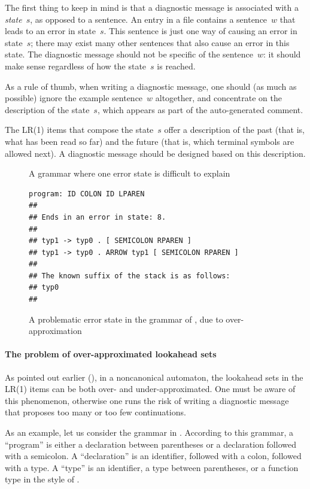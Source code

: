\documentclass[onecolumn,11pt,nocopyrightspace,preprint]{sigplanconf}
\begin{document}
The first thing to keep in mind is that a diagnostic message is associated
with a \emph{state}~$s$, as opposed to a sentence. An entry in a \messages
file contains a sentence~$w$ that leads to an error in state~$s$. This
sentence is just one way of causing an error in state~$s$; there may exist
many other sentences that also cause an error in this state. The diagnostic
message should not be specific of the sentence~$w$: it should make sense
regardless of how the state~$s$ is reached.

As a rule of thumb, when writing a diagnostic message, one should (as much as
possible) ignore the example sentence~$w$ altogether, and concentrate on the
description of the state~$s$, which appears as part of the auto-generated
comment.

The LR(1) items that compose the state~$s$ offer a description of the past
(that is, what has been read so far) and the future (that is, which terminal
symbols are allowed next). A diagnostic message should be designed based on
this description.

\begin{figure}

\caption{A grammar where one error state is difficult to explain}
\label{fig:declarations}
\end{figure}

\begin{figure}
\begin{verbatim}
program: ID COLON ID LPAREN
##
## Ends in an error in state: 8.
##
## typ1 -> typ0 . [ SEMICOLON RPAREN ]
## typ1 -> typ0 . ARROW typ1 [ SEMICOLON RPAREN ]
##
## The known suffix of the stack is as follows:
## typ0
##
\end{verbatim}
\caption{A problematic error state in the grammar of , due to over-approximation}
\label{fig:declarations:over}
\end{figure}

\paragraph{The problem of over-approximated lookahead sets}

As pointed out earlier (), in a noncanonical
automaton, the lookahead sets in the LR(1) items can be both over- and
under-approximated. One must be aware of this phenomenon, otherwise one runs
the risk of writing a diagnostic message that proposes too many or too few
continuations.

As an example, let us consider the grammar in .
According to this grammar, a ``program'' is either a declaration between
parentheses or a declaration followed with a semicolon. A ``declaration'' is
an identifier, followed with a colon, followed with a type. A ``type'' is an
identifier, a type between parentheses, or a function type in the style of
\ocaml.
\end{document}
